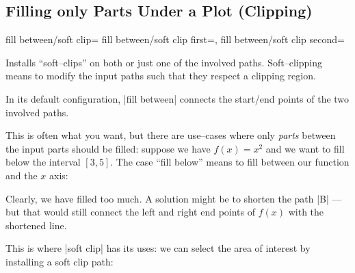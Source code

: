 \subsection{Filling only Parts Under a Plot (Clipping)}
\begin{tikzkeylist}{%
	fill between/soft clip=
	fill between/soft clip first=,
	fill between/soft clip second=%
}
	
	Installs ``soft--clips'' on both or just one of the involved paths. Soft--clipping means to modify the input paths such that they respect a clipping region.

	In its default configuration, |fill between| connects the start/end points of the two involved paths.

	This is often what you want, but there are use--cases where only \emph{parts} between the input parts should be filled: suppose we have $f(x)=x^2$ and we want to fill below the interval $[3,5]$. The case ``fill below'' means to fill between our function and the $x$ axis:

\begin{codeexample}[]
\end{codeexample}
	\noindent Clearly, we have filled too much. A solution might be to shorten the path |B| --- but that would still connect the left and right end points of $f(x)$ with the shortened line.

	This is where |soft clip| has its uses: we can select the area of interest by installing a soft clip path:
\begin{codeexample}[]
\end{codeexample}
	

\end{tikzkeylist}
